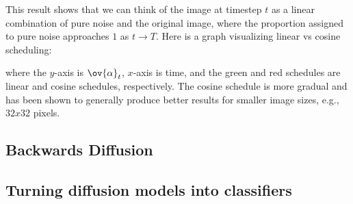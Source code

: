 This result shows that we can think of the image at timestep $t$ as a linear combination of pure noise and the original image, where the proportion assigned to pure noise approaches $1$ as $t\rightarrow T$. Here is a graph visualizing linear vs cosine scheduling: 



where the $y$-axis is $\ov{\alpha}_t$, $x$-axis is time, and the green and red schedules are linear and cosine schedules, respectively. The cosine schedule is more gradual and has been shown to generally produce better results for smaller image sizes, e.g., $32x32$ pixels. 

\subsection{Backwards Diffusion}



\subsection{Turning diffusion models into classifiers}


